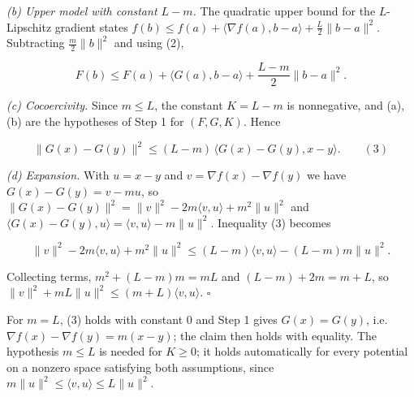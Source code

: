 \documentclass[11pt,a4paper]{article}
\begin{document}
\emph{(b) Upper model with constant \(L-m\).} The quadratic upper bound for the \(L\)-Lipschitz gradient states \(f(b)\le f(a)+\langle\nabla f(a),b-a\rangle+\frac L2\|b-a\|^2\). Subtracting \(\frac m2\|b\|^2\) and using (2),


\[F(b)\le F(a)+\langle G(a),b-a\rangle+\frac{L-m}2\|b-a\|^2.\]


\emph{(c) Cocoercivity.} Since \(m\le L\), the constant \(K=L-m\) is nonnegative, and (a), (b) are the hypotheses of Step 1 for \((F,G,K)\). Hence


\[\|G(x)-G(y)\|^2\le(L-m)\,\langle G(x)-G(y),x-y\rangle.\qquad(3)\]


\emph{(d) Expansion.} With \(u=x-y\) and \(v=\nabla f(x)-\nabla f(y)\) we have \(G(x)-G(y)=v-mu\), so \(\|G(x)-G(y)\|^2=\|v\|^2-2m\langle v,u\rangle+m^2\|u\|^2\) and \(\langle G(x)-G(y),u\rangle=\langle v,u\rangle-m\|u\|^2\). Inequality (3) becomes


\[\|v\|^2-2m\langle v,u\rangle+m^2\|u\|^2\le(L-m)\langle v,u\rangle-(L-m)m\|u\|^2.\]


Collecting terms, \(m^2+(L-m)m=mL\) and \((L-m)+2m=m+L\), so \(\|v\|^2+mL\|u\|^2\le(m+L)\langle v,u\rangle\). \(\square\)




For \(m=L\), (3) holds with constant \(0\) and Step 1 gives \(G(x)=G(y)\), i.e. \(\nabla f(x)-\nabla f(y)=m(x-y)\); the claim then holds with equality. The hypothesis \(m\le L\) is needed for \(K\ge0\); it holds automatically for every potential on a nonzero space satisfying both assumptions, since \(m\|u\|^2\le\langle v,u\rangle\le L\|u\|^2\).
\end{document}
